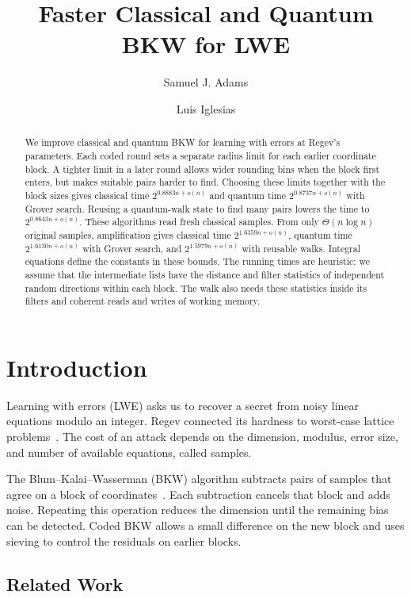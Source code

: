 \documentclass[runningheads,envcountsame,envcountsect,orivec]{llncs}
\title{Faster Classical and Quantum BKW for LWE}
\author{Samuel J. Adams \and Luis Iglesias}
\institute{PQProtect Inc., USA \\\texttt{samuel.j.adams80@gmail.com}\\ \texttt{luisiglesias.vigo@outlook.com}}
\begin{document}
\maketitle

\begin{abstract}
We improve classical and quantum BKW for learning with errors at Regev's parameters. Each coded round sets a separate radius limit for each earlier coordinate block. A tighter limit in a later round allows wider rounding bins when the block first enters, but makes suitable pairs harder to find. Choosing these limits together with the block sizes gives classical time $2^{0.8883n+o(n)}$ and quantum time $2^{0.8737n+o(n)}$ with Grover search. Reusing a quantum-walk state to find many pairs lowers the time to $2^{0.8643n+o(n)}$. These algorithms read fresh classical samples. From only $\Theta(n\log n)$ original samples, amplification gives classical time $2^{1.6359n+o(n)}$, quantum time $2^{1.6130n+o(n)}$ with Grover search, and $2^{1.5979n+o(n)}$ with reusable walks. Integral equations define the constants in these bounds. The running times are heuristic: we assume that the intermediate lists have the distance and filter statistics of independent random directions within each block. The walk also needs these statistics inside its filters and coherent reads and writes of working memory.
\end{abstract}


\section{Introduction}

Learning with errors (LWE) asks us to recover a secret from
noisy linear equations modulo an integer. Regev connected its
hardness to worst-case lattice problems~\cite{Regev09}.
The cost of an attack depends on the dimension, modulus, error
size, and number of available equations, called samples.

The Blum--Kalai--Wasserman (BKW) algorithm subtracts pairs of
samples that agree on a block of
coordinates~\cite{BKW03,ACFFP15}. Each subtraction cancels that
block and adds noise. Repeating this operation reduces the
dimension until the remaining bias can be detected. Coded BKW
allows a small difference on the new block and uses sieving to
control the residuals on earlier blocks.

\subsection{Related Work}
\label{sec:related-regev}
\end{document}
